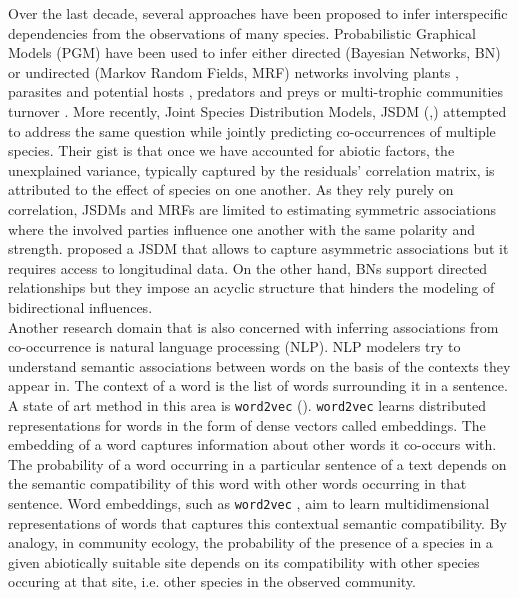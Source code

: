 \documentclass[10pt,a4paper]{article}
\begin{document}
Over the last decade, several approaches have been proposed to infer interspecific dependencies from the observations of many species. Probabilistic Graphical Models (PGM) \cite{koller2009probabilistic} have been used to infer either directed (Bayesian Networks, BN) or undirected (Markov Random Fields, MRF) networks \cite{faisal2010inferring} involving plants \cite{aderhold2012hierarchical}, parasites and potential hosts \cite{pilosof2014host}, predators and preys \cite{trifonova2015spatio}\cite{majdi2018there} or multi-trophic communities turnover \cite{ohlmann2018mapping}. More recently, Joint Species Distribution Models, JSDM (\cite{pollock2014understanding},\cite{ovaskainen2017make}) attempted to address the same question while jointly predicting co-occurrences of multiple species. Their gist is that once we have accounted for abiotic factors, the unexplained variance, typically captured by the residuals' correlation matrix, is attributed to the effect of species on one another.  As they rely purely on correlation, JSDMs and MRFs are limited to estimating symmetric associations where the involved parties influence one another with the same polarity and strength. \cite{lany2018asymmetric} proposed a JSDM that allows to capture asymmetric associations but it requires access to longitudinal data. On the other hand, BNs support directed relationships but they impose an acyclic structure that hinders the modeling of bidirectional influences. \\

Another research domain that is also concerned with inferring associations from co-occurrence is natural language processing (NLP). NLP modelers try to understand semantic associations between words on the basis of the contexts they appear in. The context of a word is the list of words surrounding it in a sentence. A state of art method in this area is \texttt{word2vec} (\cite{mikolov2013distributed}). \texttt{word2vec}  learns distributed representations for words in the form of dense vectors called embeddings. The embedding of a word captures information about other words it co-occurs with. The probability of a word occurring in a particular sentence of a text depends on the semantic compatibility of this word with other words occurring in that sentence. Word embeddings, such as \texttt{word2vec} , aim to learn multidimensional representations of words that captures this contextual semantic compatibility. By analogy, in community ecology, the probability of the presence of a species in a given abiotically suitable site depends on its compatibility with other species occuring at that site, i.e. other species in the observed community. \\
\end{document}
